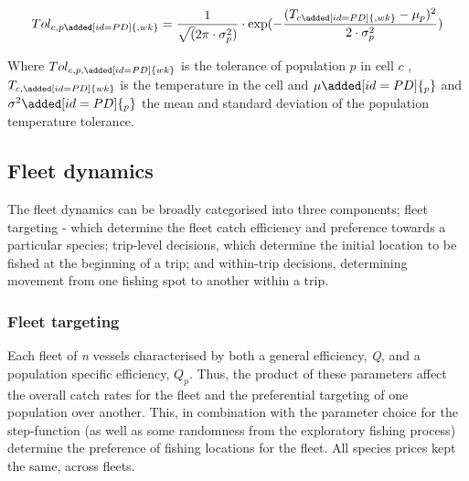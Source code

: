 \documentclass[review]{elsarticle}
\begin{document}
\begin{equation}
	Tol_{c, p\added[id=PD]{, wk}} = \frac{1}{ \sqrt (2\pi \cdot \sigma^2_{p})} \cdot \exp(-
		\frac{(T_{c\added[id=PD]{, wk}} - \mu_{p})^2}{2 \cdot \sigma^2_{p}} )	
\end{equation}

Where $Tol_{c, p, \added[id=PD]{wk}}$ is the tolerance of population $p$ in
cell $c$ , $T_{c, \added[id=PD]{wk}}$ is the
temperature in the cell  and
$\mu\added[id=PD]{_{p}}$ and $\sigma^2\added[id=PD]{_{p}}$ the mean and
standard deviation of the population temperature tolerance. \\


\subsection{Fleet dynamics}

The fleet dynamics can be broadly categorised into three components; fleet
targeting - which determine the fleet catch efficiency
and preference towards a particular species; trip-level decisions, which
determine the initial location to be fished at the beginning of
a trip; and within-trip decisions, determining movement from one fishing spot
to another within a trip.

\subsubsection{Fleet targeting}

Each fleet of \textit{n} vessels  characterised by
both a general efficiency, \textit{Q}, and a population specific efficiency,
${Q_{p}}$.  Thus, the product of these parameters affect
the overall catch rates for the fleet and the preferential targeting of one
population over another. This, in combination with the parameter choice for the
step-function  (as well as some randomness from the
exploratory fishing process) determine the preference of
fishing locations for the fleet.  All species prices
 kept the same, across fleets.  
\end{document}
